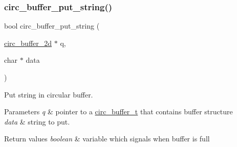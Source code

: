 \subsubsection{\texorpdfstring{circ\+\_\+buffer\+\_\+put\+\_\+string()}{circ\_buffer\_put\_string()}}
{\footnotesize\ttfamily bool circ\+\_\+buffer\+\_\+put\+\_\+string (\begin{DoxyParamCaption}\item[{\hyperlink{structcirc__buffer__2d}{circ\+\_\+buffer\+\_\+2d} $\ast$}]{q,  }\item[{char $\ast$}]{data }\end{DoxyParamCaption})}



Put string in circular buffer. 


\begin{DoxyParams}{Parameters}
{\em q} & pointer to a \hyperlink{structcirc__buffer__t}{circ\+\_\+buffer\+\_\+t} that contains buffer structure \\
\hline
{\em data} & string to put. \\
\hline
\end{DoxyParams}

\begin{DoxyRetVals}{Return values}
{\em boolean} & variable which signals when buffer is full \\
\hline
\end{DoxyRetVals}
